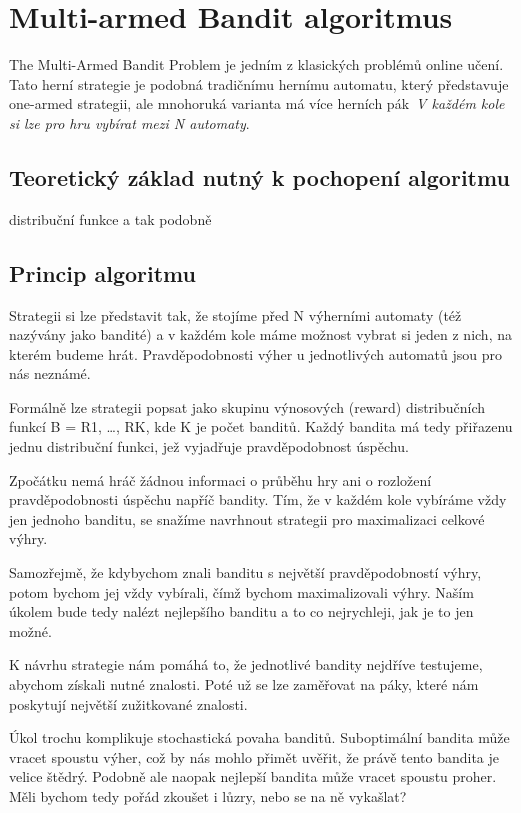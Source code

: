 \documentclass[thesis=M,czech]{FITthesis}[2014/05/07]
\begin{document}
\section{Multi-armed Bandit algoritmus}
The Multi-Armed Bandit Problem je jedním z klasických problémů online učení. Tato herní strategie je podobná tradičnímu hernímu automatu, který představuje one-armed strategii, ale mnohoruká varianta má více herních pák~\emph{V každém kole si lze pro hru vybírat mezi N automaty}. 

\subsection{Teoretický základ nutný k pochopení algoritmu}

distribuční funkce a tak podobně

\subsection{Princip algoritmu}
Strategii si lze představit tak, že stojíme před N výherními automaty (též nazývány jako bandité) a v každém kole máme možnost vybrat si jeden z nich, na kterém budeme hrát. Pravděpodobnosti výher u jednotlivých automatů jsou pro nás neznámé. 

Formálně lze strategii popsat jako skupinu výnosových (reward) distribučních funkcí B = {R1, …, RK}, kde K je počet banditů. Každý bandita má tedy přiřazenu jednu distribuční funkci, jež vyjadřuje pravděpodobnost úspěchu. 

Zpočátku nemá hráč žádnou informaci o průběhu hry ani o rozložení pravděpodobnosti úspěchu napříč bandity. Tím, že v každém kole vybíráme vždy jen jednoho banditu, se snažíme navrhnout strategii pro maximalizaci celkové výhry.

Samozřejmě, že kdybychom znali banditu s největší pravděpodobností výhry, potom bychom jej vždy vybírali, čímž bychom maximalizovali výhry. Naším úkolem bude tedy nalézt nejlepšího banditu a to co nejrychleji, jak je to jen možné.

K návrhu strategie nám pomáhá to, že jednotlivé bandity nejdříve testujeme, abychom získali nutné znalosti. Poté už se lze zaměřovat na páky, které nám poskytují největší zužitkované znalosti. 

Úkol trochu komplikuje stochastická povaha banditů. Suboptimální bandita může vracet spoustu výher, což by nás mohlo přimět uvěřit, že právě tento bandita je velice štědrý. Podobně ale naopak nejlepší bandita může vracet spoustu proher. Měli bychom tedy pořád zkoušet i lůzry, nebo se na ně vykašlat?
\end{document}
